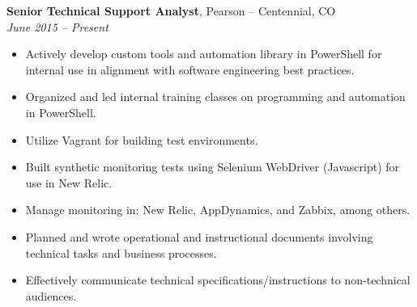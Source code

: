 {\bf Senior Technical Support Analyst}, Pearson -- Centennial, CO\\
{\it June 2015 – Present}
\begin{itemize}
	\item Actively develop custom tools and automation library in PowerShell for internal use in alignment with software engineering best practices.
	\item Organized and led internal training classes on programming and automation in PowerShell.
	\item Utilize Vagrant for building test environments.
	\item Built synthetic monitoring tests using Selenium WebDriver (Javascript) for use in New Relic.
	\item Manage monitoring in: New Relic, AppDynamics, and Zabbix, among others.
	\item Planned and wrote operational and instructional documents involving technical tasks and business processes.
	\item Effectively communicate technical specifications/instructions to non-technical audiences.
\end{itemize}